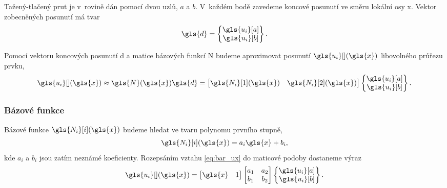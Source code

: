 Tažený-tlačený prut je v~rovině dán pomocí dvou uzlů, $a$ a $b$. V~každém bodě zavedeme koncové posunutí ve směru lokální osy \gls{x}. Vektor zobecněných posunutí má tvar
\begin{equation}
    \gls{d} = \begin{Bmatrix}
        \gls{u_i}[a] \\
        \gls{u_i}[b]
    \end{Bmatrix}.
\end{equation}

Pomocí vektoru koncových posunutí \gls{d} a matice bázových funkcí \gls{N} budeme aproximovat posunutí $\gls{u_i}[ ](\gls{x})$ libovolného průřezu prvku,
\begin{equation} \label{eq:bar_ux}
    \gls{u_i}[ ](\gls{x}) \approx \gls{N}(\gls{x}) \gls{d}
    = \begin{bmatrix}
        \gls{N_i}[1](\gls{x}) & \gls{N_i}[2](\gls{x})
    \end{bmatrix}
    \begin{Bmatrix}
        \gls{u_i}[a] \\
        \gls{u_i}[b]
    \end{Bmatrix}.
\end{equation}

\subsubsection*{Bázové funkce}

Bázové funkce $\gls{N_i}[i](\gls{x})$ budeme hledat ve tvaru polynomu prvního stupně,
\begin{equation}
    \gls{N_i}[i](\gls{x}) = a_i \gls{x} + b_i,
\end{equation}
kde $a_i$ a $b_i$ jsou zatím neznámé koeficienty. Rozepsáním vztahu \ref{eq:bar_ux} do maticové podoby dostaneme výraz
\begin{equation} \label{eq:bar_ux_matrix}
    \gls{u_i}[ ](\gls{x})
    =
    \begin{bmatrix}
        \gls{x} & 1
    \end{bmatrix}
    \begin{bmatrix}
        a_1 & a_2 \\
        b_1 & b_2
    \end{bmatrix}
    \begin{Bmatrix}
        \gls{u_i}[a] \\
        \gls{u_i}[b]
    \end{Bmatrix}.
\end{equation}


